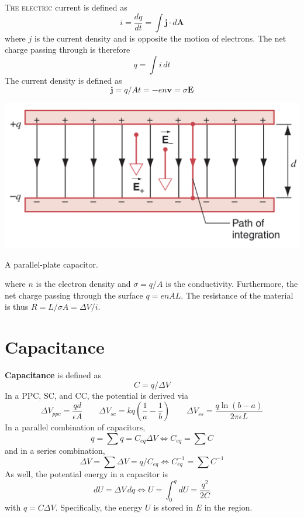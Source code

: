 \documentclass{tufte-book}
\renewcommand{\b}{\mathbf}
\begin{document}
\textsc{The electric} current is defined as \begin{equation}
  i = \frac{dq}{dt} = \int \b j \cdot d \b A
\end{equation} where $j$ is the current density and is opposite the motion of electrons. The net charge passing through is therefore \begin{equation}
  q = \int i \, dt
\end{equation}
The current density is defined as \begin{equation}
  \b j = q/At = - en \b v = \sigma \b E
\end{equation}
\begin{marginfigure}
  \includegraphics[width=1\textwidth]{ppc}
  \caption{A parallel-plate capacitor.}
\end{marginfigure}
where $n$ is the electron density and $\sigma = q/A$ is the conductivity. Furthermore, the net charge passing through the surface $q = enAL$. The resistance of the material is thus $R = L/\sigma A = \Delta V / i$.

\section{Capacitance}
\textbf{Capacitance} is defined as \begin{equation}
  C = q / \Delta V
\end{equation}
In a PPC, SC, and CC, the potential is derived via \begin{equation}
  \Delta V_{ppc} = \frac{qd}{\epsilon A} \qquad \Delta V_{sc} =kq \left(\frac{1}{a} - \frac{1}{b} \right) \qquad \Delta V_{ss} = \frac{q \ln (b-a)}{2 \pi \epsilon L}
\end{equation}
In a parallel combination of capacitors, \begin{equation}
  q = \sum q  = C_{eq} \Delta V \iff  C_{eq} = \sum C
\end{equation}
and in a series combination, \begin{equation}
  \Delta V = \sum \Delta V = q/C_{eq} \iff C_{eq}^{-1} = \sum C^{-1}
\end{equation}
As well, the potential energy in a capacitor is \begin{equation}
  dU = \Delta V \, dq \iff U = \int_0^q dU = \frac{q^2}{2C}
\end{equation}
with $q = C \Delta V$. Specifically, the energy $U$ is stored in $E$ in the region.
\end{document}
